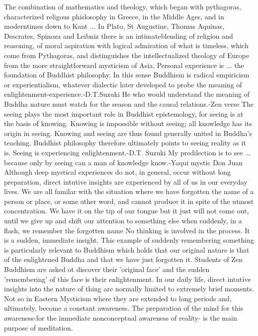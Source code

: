 The combination of mathematics and theology, which began with pythagoras, characterized religous phislosophy in Greece, in the Middle Ages, and in moderntimes down to Kant ... In Plato, St Augustine, Thomas Aquinas, Descrates, Spinoza and Leibniz there is an intimateblending of religion and reasoning, of moral aspiration with logical admiration of what is timeless, which come from Pythagoras, and distinguishes the intellectualized theology of Europe from the more straightforward mysticism of Asia.
Personal experience is ... the foundation of Buddhist philosophy. In this sense Buddhism is radical empiricism or experientialism, whatever dialectic later developed to probe the meaning of enlightenment-experience.-D.T.Suzuki
He who would understand the meaning of Buddha nature must watch for the season and the causal relations.-Zen verse
The seeing plays the most important role in Buddhist epistemology, for seeing is at the basis of knowing. Knowing is impossible without seeing; all knowledge has its origin in seeing. Knowing and seeing are thus found generally united in Buddha's teaching. Buddhist philosophy therefore ultimately points to seeing reality as it is. Seeing is experiencing enlightenment.-D.T. Suzuki
My predilection is to see ... because only by seeing can a man of knowledge know.-Yaqui mystic Don Juan
Although deep mystical experiences do not, in general, occur without long preparation, direct intutive insights are experienced by all of us in our everyday lives. We are all familar with the situation where we have forgotten the name of a person or place, or some other word, and cannot produce it in spite of the utmost concentration. We have it on the tip of our tongue but it just will not come out, until we give up and shift our attention to something else when suddenly, in a flash, we remember the forgotten name No thinking is involved in the process. It is a sudden, immediate insight. This example of suddenly remembering something is particularly relevant to Buddhism which holds that our original nature is that of the enlightened Buddha and that we have just forgotten it. Students of Zen Buddhism are asked ot discover their 'original face' and the sudden 'remembering' of this face is their enlightenment.
In our daily life, direct intutive insights into the nature of thing are normally limited to extremely brief moments. Not so in Eastern Mysticism where they are extended to long periods and, ultimately, become a constant awareness. The preparation of the mind for this awareness-for the immediate nonconceptual awareness of reality- is the main purpose of meditation.
